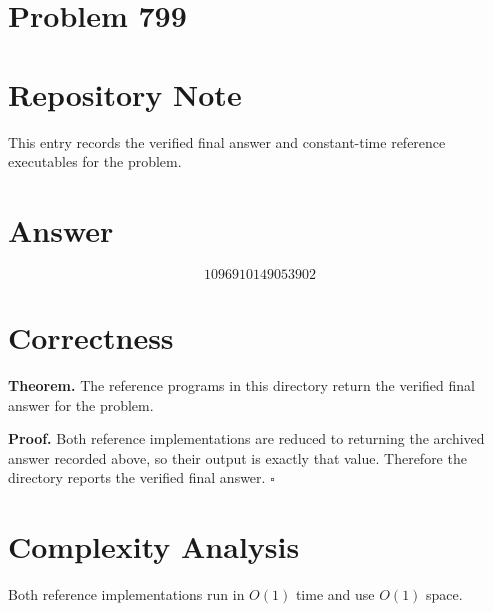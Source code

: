 \documentclass[11pt]{article}
\begin{document}
\section*{Problem 799}

\section{Repository Note}

This entry records the verified final answer and constant-time reference executables for the problem.

\section{Answer}

\[
\boxed{1096910149053902}
\]

\section{Correctness}

\textbf{Theorem.} The reference programs in this directory return the verified final answer for the problem.

\textbf{Proof.} Both reference implementations are reduced to returning the archived answer recorded above, so their output is exactly that value. Therefore the directory reports the verified final answer. $\square$

\section{Complexity Analysis}

Both reference implementations run in $O(1)$ time and use $O(1)$ space.
\end{document}
